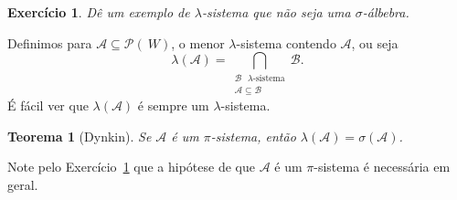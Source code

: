 \documentclass[reqno, draft]{book}
\newcommand*\1{\mathds{1}}
\newtheorem{theorem}{Teorema}[section]
\newtheorem{exercise}[example]{Exercício}
\begin{document}
\begin{exercise}
  \label{x:lambda_nao_sigma}
  Dê um exemplo de $\lambda$-sistema que não seja uma $\sigma$-álbebra.
\end{exercise}

Definimos para $\mathcal{A} \subseteq \mathcal{P}(~W)$, o menor $\lambda$-sistema contendo $\mathcal{A}$, ou seja
\begin{equation}
  \lambda(\mathcal{A}) = \bigcap_{\substack{\text{$\mathcal{B}$ $\lambda$-sistema}\\\mathcal{A} \subseteq \mathcal{B}}} \mathcal{B}.
\end{equation}
É fácil ver que $\lambda(\mathcal{A})$ é sempre um $\lambda$-sistema.

\begin{theorem}[Dynkin]
  \label{t:dynkin}
  Se $\mathcal{A}$ é um $\pi$-sistema, então $\lambda(\mathcal{A}) = \sigma(\mathcal{A})$.
\end{theorem}

Note pelo Exercício~\ref{x:lambda_nao_sigma} que a hipótese de que $\mathcal{A}$ é um $\pi$-sistema é necessária em geral.
\end{document}
